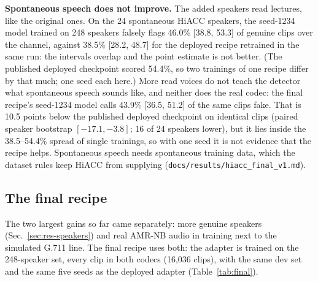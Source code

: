 \textbf{Spontaneous speech does not improve.} The added speakers read lectures, like the
original ones. On the 24 spontaneous HiACC speakers, the seed-1234 model trained on 248
speakers falsely flags 46.0\% [38.8, 53.3] of genuine clips over the channel, against
38.5\% [28.2, 48.7] for the deployed recipe retrained in the same run: the intervals
overlap and the point estimate is not better. (The published deployed checkpoint scored
54.4\%, so two trainings of one recipe differ by that much; one seed each here.) More
read voices do not teach the detector what spontaneous speech sounds like, and neither
does the real codec: the final recipe's seed-1234 model calls 43.9\% [36.5, 51.2] of the
same clips fake. That is 10.5 points below the published deployed checkpoint on identical
clips (paired speaker bootstrap $[-17.1, -3.8]$; 16 of 24 speakers lower), but it lies
inside the 38.5--54.4\% spread of single trainings, so with one seed it is not evidence
that the recipe helps. Spontaneous speech needs spontaneous training data, which the
dataset rules keep HiACC from supplying
(\texttt{docs/results/hiacc\_final\_v1.md}).

\subsection{The final recipe}
\label{sec:res-final}

The two largest gains so far came separately: more genuine speakers
(Sec.~\ref{sec:res-speakers}) and real AMR-NB audio in training next to the simulated
G.711 line. The final recipe uses both: the adapter is trained on the 248-speaker set,
every clip in both codecs (16{,}036 clips), with the same dev set and the same five seeds
as the deployed adapter (Table~\ref{tab:final}).

